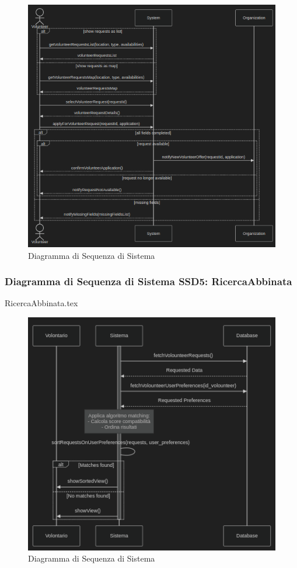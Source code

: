 \documentclass[12pt]{article}
\begin{document}
\begin{figure}[H]
    \includegraphics[width=\textwidth,keepaspectratio]{Immagini/SSD/Iterazione 2/SSDGestioneOfferteVolontariato.png}
        \caption{Diagramma di Sequenza di Sistema}
        \label{fig:diagrammaSSD4}
\end{figure}

\subsubsection{Diagramma di Sequenza di Sistema SSD5: RicercaAbbinata}
{RicercaAbbinata.tex}

\begin{figure}[H]
\includegraphics[width=\textwidth, keepaspectratio]{Immagini/SSD/Iterazione 2/SSDRicercaAbbinata.png}
        \caption{Diagramma di Sequenza di Sistema}
        \label{fig:diagrammaSSD5}
\end{figure}
\end{document}
